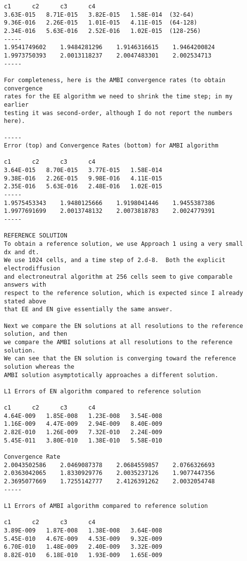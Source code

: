 \documentclass[final]{siamltex}
\begin{document}
\begin{verbatim}
c1		c2		c3		c4
3.63E-015	8.71E-015	3.82E-015	1.58E-014  (32-64)
9.36E-016	2.26E-015	1.01E-015	4.11E-015  (64-128)
2.34E-016	5.63E-016	2.52E-016	1.02E-015  (128-256)
-----
1.9541749602	1.9484281296	1.9146316615	1.9464200824
1.9973750393	2.0013118237	2.0047483301	2.002534713
-----

For completeness, here is the AMBI convergence rates (to obtain convergence 
rates for the EE algorithm we need to shrink the time step; in my earlier 
testing it was second-order, although I do not report the numbers here).

-----
Error (top) and Convergence Rates (bottom) for AMBI algorithm

c1		c2		c3		c4
3.64E-015	8.70E-015	3.77E-015	1.58E-014
9.38E-016	2.26E-015	9.98E-016	4.11E-015
2.35E-016	5.63E-016	2.48E-016	1.02E-015
-----			
1.9575453343	1.9480125666	1.9198041446	1.9455387386
1.9977691699	2.0013748132	2.0073818783	2.0024779391
-----

REFERENCE SOLUTION
To obtain a reference solution, we use Approach 1 using a very small dx and dt.
We use 1024 cells, and a time step of 2.d-8.  Both the explicit electrodiffusion
and electroneutral algorithm at 256 cells seem to give comparable answers with
respect to the reference solution, which is expected since I already stated above
that EE and EN give essentially the same answer.

Next we compare the EN solutions at all resolutions to the reference solution, and then
we compare the AMBI solutions at all resolutions to the reference solution.
We can see that the EN solution is converging toward the reference solution whereas the
AMBI solution asymptotically approaches a different solution.

L1 Errors of EN algorithm compared to reference solution

c1		c2		c3		c4
4.64E-009	1.85E-008	1.23E-008	3.54E-008
1.16E-009	4.47E-009	2.94E-009	8.40E-009
2.82E-010	1.26E-009	7.32E-010	2.24E-009
5.45E-011	3.80E-010	1.38E-010	5.58E-010
			
Convergence Rate			
2.0043502586	2.0469087378	2.0684559857	2.0766326693
2.0363042065	1.8330929776	2.0035237126	1.9077447356
2.3695077669	1.7255142777	2.4126391262	2.0032054748
-----

L1 Errors of AMBI algorithm compared to reference solution

c1		c2		c3		c4
3.89E-009	1.87E-008	1.38E-008	3.64E-008
5.45E-010	4.67E-009	4.53E-009	9.32E-009
6.70E-010	1.48E-009	2.40E-009	3.32E-009
8.82E-010	6.18E-010	1.93E-009	1.65E-009
			

\end{verbatim}
\end{document}
